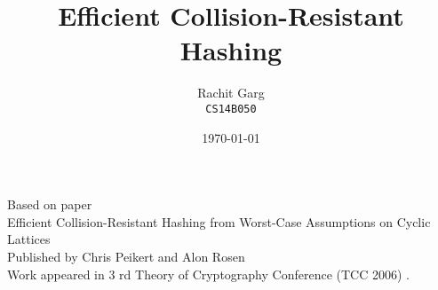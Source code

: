 \documentclass[11pt]{article}
\title{Efficient Collision-Resistant Hashing}
\author{Rachit Garg \\ \texttt{CS14B050}}
\date{\today}
\theoremstyle{plain}%
\theoremstyle{definition}
\begin{document}
\maketitle
\begin{center}
Based on paper\\Efficient Collision-Resistant Hashing from
Worst-Case Assumptions on Cyclic Lattices \\Published by Chris Peikert  and Alon Rosen\\ Work appeared in 3 rd Theory of Cryptography Conference (TCC 2006) \cite{Peikert:2006:ECH:2180286.2180297}.
\end{center}

\tableofcontents












{}

\end{document}
